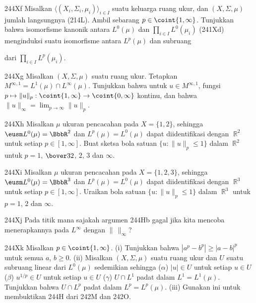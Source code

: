 {\spheader 244Xf Misalkan
$\langle(X_i,\Sigma_i,\mu_i)\rangle_{i\in I}$ suatu keluarga ruang ukur,
dan $(X,\Sigma,\mu)$ jumlah langsungnya (214L). Ambil sebarang
$p\in\coint{1,\infty}$. Tunjukkan bahwa isomorfisme kanonik antara
$L^0(\mu)$ dan $\prod_{i\in I}L^0(\mu_i)$ (241Xd) menginduksi suatu
isomorfisme antara $L^p(\mu)$ dan subruang


\noindent dari $\prod_{i\in I}L^p(\mu_i)$.

\spheader 244Xg Misalkan $(X,\Sigma,\mu)$ suatu ruang ukur. Tetapkan
$M^{\infty,1}=L^1(\mu)\cap L^{\infty}(\mu)$. Tunjukkan bahwa untuk
$u\in M^{\infty,1}$, fungsi
$p\mapsto\|u\|_p:\coint{1,\infty}\to\coint{0,\infty}$ kontinu, dan bahwa
$\|u\|_{\infty}=\lim_{p\to\infty}\|u\|_p$. 

\spheader 244Xh Misalkan $\mu$ ukuran pencacahan pada $X=\{1,2\}$,
sehingga $\eusm L^0(\mu)=\BbbR^2$ dan $L^p(\mu)=L^0(\mu)$ dapat
diidentifikasi dengan $\BbbR^2$ untuk setiap $p\in[1,\infty]$. Buat
sketsa bola satuan $\{u:\|u\|_p\le 1\}$ dalam $\BbbR^2$ untuk
$p=1$, $\bover32$, $2$, $3$ dan $\infty$.

\spheader 244Xi Misalkan $\mu$ ukuran pencacahan pada $X=\{1,2,3\}$,
sehingga $\eusm L^0(\mu)=\BbbR^3$ dan $L^p(\mu)=L^0(\mu)$ dapat
diidentifikasi dengan $\BbbR^3$ untuk setiap $p\in[1,\infty]$. Uraikan
bola satuan $\{u:\|u\|_p\le 1\}$ dalam $\BbbR^3$ untuk $p=1$, $2$ dan
$\infty$.

\spheader 244Xj Pada titik mana sajakah argumen 244Hb gagal jika kita
mencoba menerapkannya pada $L^{\infty}$ dengan $\|\,\|_{\infty}$?

\spheader 244Xk Misalkan $p\in\coint{1,\infty}$. (i) Tunjukkan bahwa
$|a^p-b^p|\ge|a-b|^p$ untuk semua $a$, $b\ge 0$.
(ii) Misalkan $(X,\Sigma,\mu)$ suatu ruang ukur dan $U$ suatu subruang
linear dari $L^0(\mu)$ sedemikian sehingga ($\alpha$) $|u|\in U$ untuk
setiap $u\in U$ ($\beta$) $u^{1/p}\in U$ untuk setiap $u\in U$
($\gamma$) $U\cap L^1$ padat dalam $L^1=L^1(\mu)$. Tunjukkan bahwa
$U\cap L^p$ padat dalam $L^p=L^p(\mu)$.  (iii) Gunakan ini untuk membuktikan 244H
dari 242M dan 242O.

}
